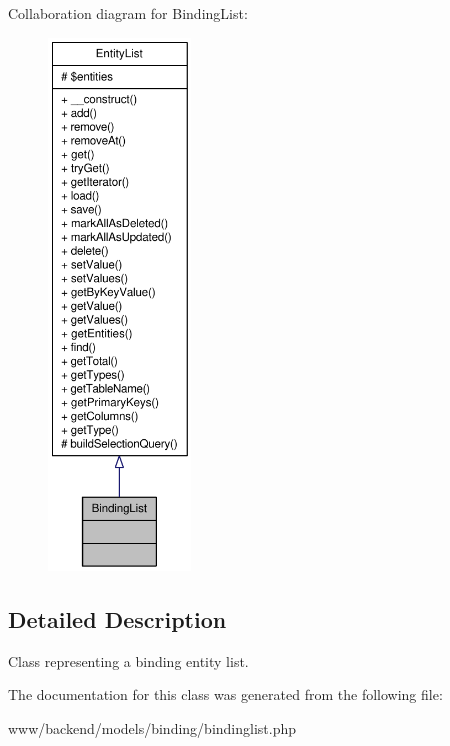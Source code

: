 Collaboration diagram for BindingList:\nopagebreak
\begin{figure}[H]
\begin{center}
\leavevmode
\includegraphics[height=400pt]{classBindingList__coll__graph}
\end{center}
\end{figure}


\subsection{Detailed Description}
Class representing a binding entity list. 

The documentation for this class was generated from the following file:\begin{DoxyCompactItemize}
\item 
www/backend/models/binding/bindinglist.php\end{DoxyCompactItemize}
